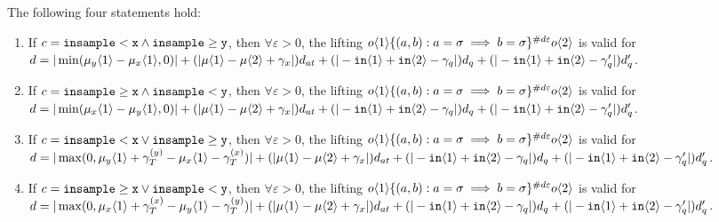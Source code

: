 \begin{lemma}
    The following four statements hold:\begin{enumerate}
        \item If $c = \lguard[\texttt{x}] \land \gguard[\texttt{y}]$, then $\forall \varepsilon>0$, the lifting $o\brangle{1}\{(a, b): a=\sigma\implies b=\sigma\}^{\#d\varepsilon}o\brangle{2}$ is valid for $d = |\min(\mu_y\brangle{1}-\mu_x\brangle{1}, 0)|+(|\mu\brangle{1}-\mu\brangle{2}+\gamma_x|)d_{at}+(|-\texttt{in}\brangle{1}+\texttt{in}\brangle{2}-\gamma_q|)d_q+(|-\texttt{in}\brangle{1}+\texttt{in}\brangle{2}-\gamma_q'|)d_q'$. 
        \item If $c = \gguard[\texttt{x}] \land \lguard[\texttt{y}]$, then $\forall \varepsilon>0$, the lifting $o\brangle{1}\{(a, b): a=\sigma\implies b=\sigma\}^{\#d\varepsilon}o\brangle{2}$ is valid for $d = |\min(\mu_x\brangle{1}-\mu_y\brangle{1}, 0)|+(|\mu\brangle{1}-\mu\brangle{2}+\gamma_x|)d_{at}+(|-\texttt{in}\brangle{1}+\texttt{in}\brangle{2}-\gamma_q|)d_q+(|-\texttt{in}\brangle{1}+\texttt{in}\brangle{2}-\gamma_q'|)d_q'$. 
        \item If $c = \lguard[\texttt{x}] \lor \gguard[\texttt{y}]$, then $\forall \varepsilon>0$, the lifting $o\brangle{1}\{(a, b): a=\sigma\implies b=\sigma\}^{\#d\varepsilon}o\brangle{2}$ is valid for $d = |\max(0, \mu_y\brangle{1}+ \gamma_T^{(y)}-\mu_x\brangle{1}-\gamma_T^{(x)})|+(|\mu\brangle{1}-\mu\brangle{2}+\gamma_x|)d_{at}+(|-\texttt{in}\brangle{1}+\texttt{in}\brangle{2}-\gamma_q|)d_q+(|-\texttt{in}\brangle{1}+\texttt{in}\brangle{2}-\gamma_q'|)d_q'$. 
        \item If $c = \gguard[\texttt{x}] \lor \lguard[\texttt{y}]$, then $\forall \varepsilon>0$, the lifting $o\brangle{1}\{(a, b): a=\sigma\implies b=\sigma\}^{\#d\varepsilon}o\brangle{2}$ is valid for $d = |\max(0, \mu_x\brangle{1}+ \gamma_T^{(x)}-\mu_y\brangle{1}-\gamma_T^{(y)})|+(|\mu\brangle{1}-\mu\brangle{2}+\gamma_x|)d_{at}+(|-\texttt{in}\brangle{1}+\texttt{in}\brangle{2}-\gamma_q|)d_q+(|-\texttt{in}\brangle{1}+\texttt{in}\brangle{2}-\gamma_q'|)d_q'$. 
    \end{enumerate}
\end{lemma}
